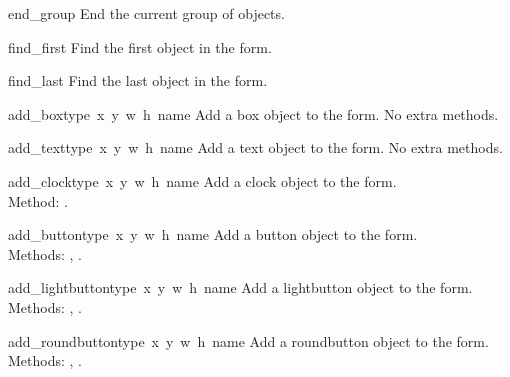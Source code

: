 \begin{flushleft}
\begin{funcdesc}{end_group}{}
  End the current group of objects.
\end{funcdesc}

\begin{funcdesc}{find_first}{}
  Find the first object in the form.
\end{funcdesc}

\begin{funcdesc}{find_last}{}
  Find the last object in the form.
\end{funcdesc}


\begin{funcdesc}{add_box}{type\, x\, y\, w\, h\, name}
Add a box object to the form.
No extra methods.
\end{funcdesc}

\begin{funcdesc}{add_text}{type\, x\, y\, w\, h\, name}
Add a text object to the form.
No extra methods.
\end{funcdesc}


\begin{funcdesc}{add_clock}{type\, x\, y\, w\, h\, name}
Add a clock object to the form. \\
Method:
.
\end{funcdesc}


\begin{funcdesc}{add_button}{type\, x\, y\, w\, h\,  name}
Add a button object to the form. \\
Methods:
,
.
\end{funcdesc}

\begin{funcdesc}{add_lightbutton}{type\, x\, y\, w\, h\, name}
Add a lightbutton object to the form. \\
Methods:
,
.
\end{funcdesc}

\begin{funcdesc}{add_roundbutton}{type\, x\, y\, w\, h\, name}
Add a roundbutton object to the form. \\
Methods:
,
.
\end{funcdesc}


\end{flushleft}
